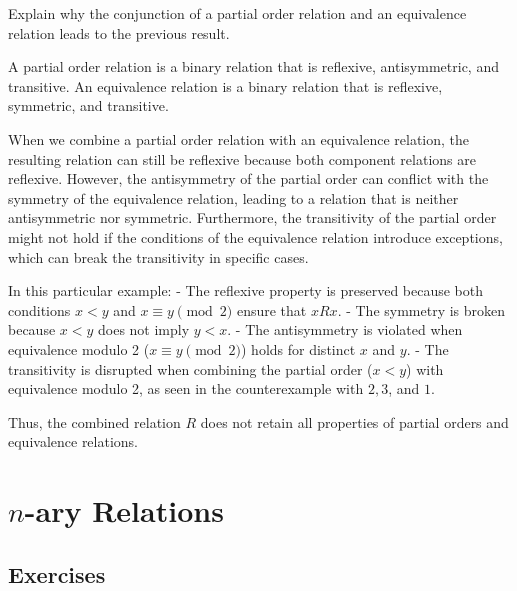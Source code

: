 \begin{exercise}
Explain why the conjunction of a partial order relation and an equivalence relation leads to the previous result.
\end{exercise}

\begin{solution}
A partial order relation is a binary relation that is reflexive, antisymmetric, and transitive. An equivalence relation is a binary relation that is reflexive, symmetric, and transitive.

When we combine a partial order relation with an equivalence relation, the resulting relation can still be reflexive because both component relations are reflexive. However, the antisymmetry of the partial order can conflict with the symmetry of the equivalence relation, leading to a relation that is neither antisymmetric nor symmetric. Furthermore, the transitivity of the partial order might not hold if the conditions of the equivalence relation introduce exceptions, which can break the transitivity in specific cases.

In this particular example:
- The reflexive property is preserved because both conditions $x < y$ and $x \equiv y \pmod{2}$ ensure that $xRx$.
- The symmetry is broken because $x < y$ does not imply $y < x$.
- The antisymmetry is violated when equivalence modulo 2 ($x \equiv y \pmod{2}$) holds for distinct $x$ and $y$.
- The transitivity is disrupted when combining the partial order ($x < y$) with equivalence modulo 2, as seen in the counterexample with $2, 3$, and $1$.

Thus, the combined relation $R$ does not retain all properties of partial orders and equivalence relations.
\end{solution}
\section{\(n\)-ary Relations}

\subsection{Exercises}



